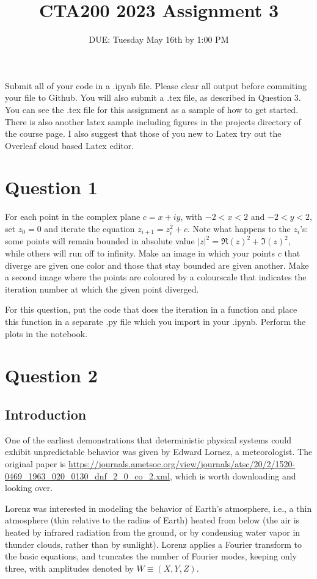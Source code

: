\documentclass{article}
\title{CTA200 2023 Assignment 3}
\author{DUE: Tuesday May 16th by 1:00 PM}
\date{}
\begin{document}
\maketitle

Submit all of your code in a .ipynb file. Please clear all output before commiting your file to Github. You will also submit a .tex file, as described in Question 3. You can see the .tex file for this assignment as a sample of how to get started. There is also another latex sample including figures in the projects directory of the course page. I also suggest that those of you new to Latex try out the Overleaf cloud based Latex editor.

\section*{Question 1}

For each point in the complex plane $c = x + iy$, with $-2 < x < 2$ and $-2 < y < 2$, set $z_0 = 0$ and iterate the equation $z_{i + 1} = z_i^2 + c$. 
Note what happens to the $z_i$'s: some points will remain bounded in absolute value $|z|^2 = \Re(z)^2 + \Im(z)^2$, while others will run off to infinity. 
Make an image  in which your points $c$ that diverge are given one color and those that stay bounded are given another.
Make a second image where the points are coloured by a colourscale that indicates the iteration number at which the given point diverged.

For this question, put the code that does the iteration in a function and place this function in a separate .py file which you import in your .ipynb.
Perform the plots in the notebook.

\section*{Question 2}

\subsection*{Introduction}
One of the earliest demonstrations that deterministic physical systems could exhibit unpredictable behavior was given by Edward Lornez, a meteorologist. The original paper is \url{https://journals.ametsoc.org/view/journals/atsc/20/2/1520-0469_1963_020_0130_dnf_2_0_co_2.xml}, which is worth downloading and looking over.

Lorenz was interested in modeling the behavior of Earth's atmosphere, i.e., a thin atmosphere (thin relative to the radius of Earth) heated from below (the air is heated by infrared radiation from the ground, or by condensing water vapor in thunder clouds, rather than by sunlight). Lorenz applies a Fourier transform to the basic equations, and truncates the number of Fourier modes, keeping only three, with amplitudes denoted by $W\equiv(X, Y, Z)$.
\end{document}
